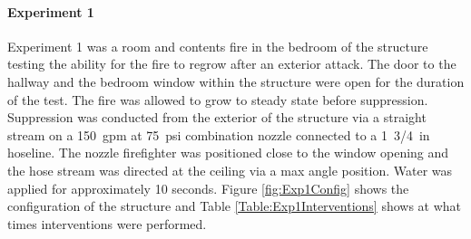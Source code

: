 \documentclass[12pt,oneside]{book}
\begin{document}
\begin{minipage}[t][9in][s]{6.25in}





\vfill


\titlesigs

\end{minipage}

\frontmatter

\paragraph{Experiment 1} \mbox{}

Experiment 1 was a room and contents fire in the bedroom of the structure testing the ability for the fire to regrow after an exterior attack. The door to the hallway and the bedroom window within the structure were open for the duration of the test. The fire was allowed to grow to steady state before suppression. Suppression was conducted from the exterior of the structure via a straight stream on a 150~gpm at 75~psi combination nozzle connected to a 1~3/4~in hoseline. The nozzle firefighter was positioned close to the window opening and the hose stream was directed at the ceiling via a max angle position. Water was applied for approximately 10 seconds. Figure \ref{fig:Exp1Config} shows the configuration of the structure and Table \ref{Table:Exp1Interventions} shows at what times interventions were performed. 
\end{document}
